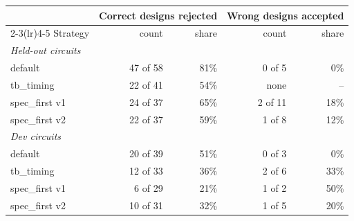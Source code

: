 \begin{tabular}{l rr rr}
\toprule
& \multicolumn{2}{c}{Correct designs rejected} & \multicolumn{2}{c}{Wrong designs accepted} \\
\cmidrule(lr){2-3}\cmidrule(lr){4-5}
Strategy & count & share & count & share \\
\midrule
\multicolumn{5}{l}{\textit{Held-out circuits}} \\
default & 47 of 58 & 81\% & 0 of 5 & 0\% \\
tb\_timing & 22 of 41 & 54\% & none & -- \\
spec\_first v1 & 24 of 37 & 65\% & 2 of 11 & 18\% \\
spec\_first v2 & 22 of 37 & 59\% & 1 of 8 & 12\% \\
\midrule
\multicolumn{5}{l}{\textit{Dev circuits}} \\
default & 20 of 39 & 51\% & 0 of 3 & 0\% \\
tb\_timing & 12 of 33 & 36\% & 2 of 6 & 33\% \\
spec\_first v1 & 6 of 29 & 21\% & 1 of 2 & 50\% \\
spec\_first v2 & 10 of 31 & 32\% & 1 of 5 & 20\% \\
\bottomrule
\end{tabular}

